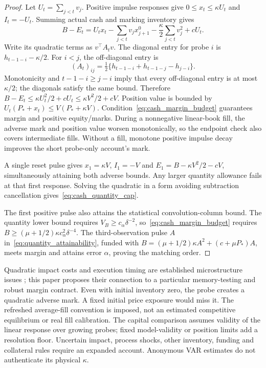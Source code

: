 \documentclass[11pt]{article}
\begin{document}
\begin{proof}
Let $U_t=\sum_{j<t}v_j$. Positive impulse responses give $0\le x_t\le\kappa U_t$ and $I_t=-U_t$. Summing actual cash and marking inventory gives
\[
B-E_t=U_tx_t-\sum_{j<t}v_jx^0_{j+1}
-\frac\kappa2\sum_{j<t}v_j^2+cU_t.
\]
Write its quadratic terms as $v^\top A_tv$. The diagonal entry for probe $i$ is $h_{t-1-i}-\kappa/2$. For $i<j$, the off-diagonal entry is
\[
(A_t)_{ij}=\tfrac12\{h_{t-1-i}+h_{t-1-j}-h_{j-i}\}.
\]
Monotonicity and $t-1-i\ge j-i$ imply that every off-diagonal entry is at most $\kappa/2$; the diagonals satisfy the same bound. Therefore
$B-E_t\le\kappa U_t^2/2+cU_t\le\kappa V^2/2+cV$.
Position value is bounded by $U_t(P_*+x_t)\le V(P_*+\kappa V)$.
Condition~\eqref{eq:cash_margin_budget} guarantees margin and positive equity/marks. During a nonnegative linear-book fill, the adverse mark and position value worsen monotonically, so the endpoint check also covers intermediate fills. Without a fill, monotone positive impulse decay improves the short probe-only account's mark.

A single reset pulse gives $x_1=\kappa V$, $I_1=-V$ and $E_1=B-\kappa V^2/2-cV$, simultaneously attaining both adverse bounds. Any larger quantity allowance fails at that first response. Solving the quadratic in a form avoiding subtraction cancellation gives~\eqref{eq:cash_quantity_cap}.

The first positive pulse also attains the statistical convolution-column bound. The quantity lower bound requires $V_B\ge c_\alpha\delta^{-2}$, so~\eqref{eq:cash_margin_budget} requires $B\ge(\mu+1/2)\kappa c_\alpha^2\delta^{-4}$. The third-observation pulse $A$ in~\eqref{eq:quantity_attainability}, funded with $B=(\mu+1/2)\kappa A^2+(c+\mu P_*)A$, meets margin and attains error $\alpha$, proving the matching order.
\end{proof}

Quadratic impact costs and execution timing are established microstructure issues \citep{almgren2000}; this paper proposes their connection to a particular memory-testing and robust margin contract. Even with initial inventory zero, the probe creates a quadratic adverse mark. A fixed initial price exposure would miss it. The refreshed average-fill convention is imposed, not an estimated competitive equilibrium or real fill calibration. The capital comparison assumes validity of the linear response over growing probes; fixed model-validity or position limits add a resolution floor. Uncertain impact, process shocks, other inventory, funding and collateral rules require an expanded account. Anonymous VAR estimates do not authenticate its physical $\kappa$.
\end{document}

